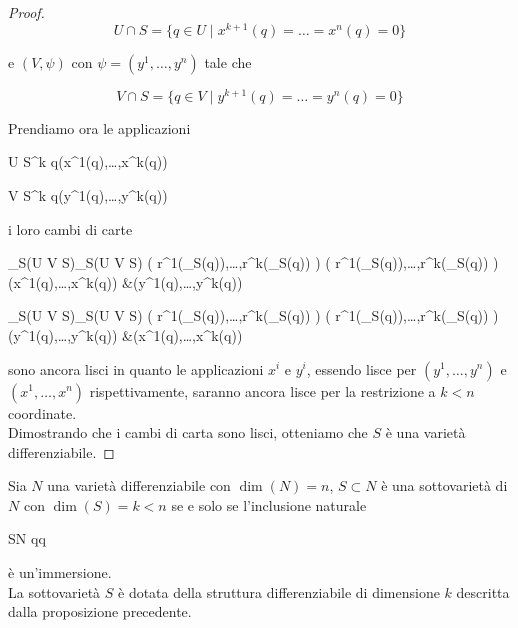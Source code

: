 \begin{proof}
	\begin{equation}
		U \cap S = \{ q \in U \mid x^{k+1}(q) = \dots = x^{n}(q) = 0 \}
	\end{equation}
	
	e $ (V,\psi) $ con $ \psi = (y^{1},\dots,y^{n}) $ tale che
	
	\begin{equation}
		V \cap S = \{ q \in V \mid y^{k+1}(q) = \dots = y^{n}(q) = 0 \}
	\end{equation}

	Prendiamo ora le applicazioni
	
		{U \cap S}{\R^{k}}
		{q}{(x^{1}(q),\dots,x^{k}(q))}

		{V \cap S}{\R^{k}}
		{q}{(y^{1}(q),\dots,y^{k}(q))}

	i loro cambi di carte
	
		{\phi_{S}(U \cap V \cap S)}{\psi_{S}(U \cap V \cap S)}
		{\left( r^{1}(\phi_{S}(q)),\dots,r^{k}(\phi_{S}(q)) \right)}{%
			\left( r^{1}(\psi_{S}(q)),\dots,r^{k}(\psi_{S}(q)) \right)\\
			(x^{1}(q),\dots,x^{k}(q)) &\mapsto (y^{1}(q),\dots,y^{k}(q))}
	
	\map{\phi_{S} \circ \psi_{S}^{-1}}
		{\psi_{S}(U \cap V \cap S)}{\phi_{S}(U \cap V \cap S)}
		{\left( r^{1}(\psi_{S}(q)),\dots,r^{k}(\psi_{S}(q)) \right)}{%
			\left( r^{1}(\phi_{S}(q)),\dots,r^{k}(\phi_{S}(q)) \right)\\
			(y^{1}(q),\dots,y^{k}(q)) &\mapsto (x^{1}(q),\dots,x^{k}(q))}

	sono ancora lisci in quanto le applicazioni $ x^{i} $ e $ y^{i} $, essendo lisce per $ (y^{1},\dots,y^{n}) $ e $ (x^{1},\dots,x^{n}) $ rispettivamente, saranno ancora lisce per la restrizione a $ k < n $ coordinate.\\
	Dimostrando che i cambi di carta sono lisci, otteniamo che $ S $ è una varietà differenziabile.
\end{proof}

\begin{definition}\label{prop:subman-incl-immersion}
	Sia $ N $ una varietà differenziabile con $ \dim(N) = n $, $ S \subset N $ è una sottovarietà di $ N $ con $ \dim(S) = k < n $ se e solo se l'inclusione naturale
	
		{S}{N}
		{q}{q}

	è un'immersione.\\
	La sottovarietà $ S $ è dotata della struttura differenziabile di dimensione $ k $ descritta dalla proposizione precedente.
\end{definition}

